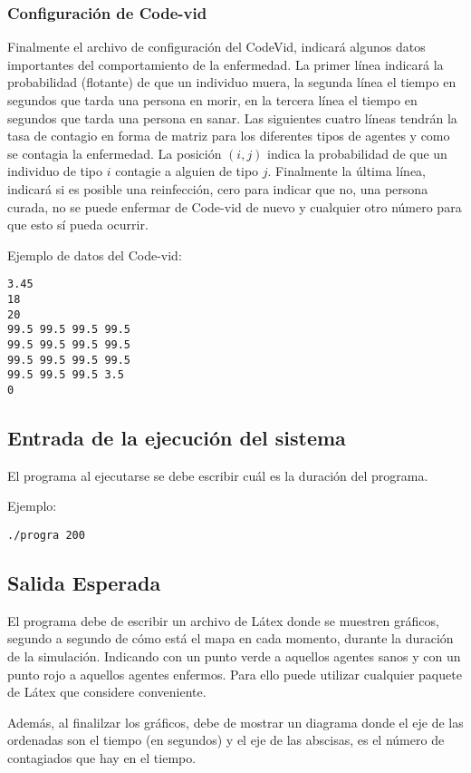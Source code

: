 \documentclass[11pt]{article}
\begin{document}
\subsubsection{Configuración de Code-vid}
Finalmente el archivo de configuración del CodeVid, indicará algunos datos importantes del comportamiento de la enfermedad.
La primer línea indicará la probabilidad (flotante) de que un individuo muera, la segunda línea el tiempo en segundos que tarda una persona en morir, en la tercera línea el tiempo en segundos que tarda una persona en sanar. Las siguientes cuatro líneas tendrán la tasa de contagio en forma de matriz para los diferentes tipos de agentes y como se contagia la enfermedad. La posición $(i,j)$ indica la probabilidad de que un individuo de tipo $i$ contagie a alguien de tipo $j$. Finalmente la última línea, indicará si es posible una reinfección, cero para indicar que no, una persona curada, no se puede enfermar de Code-vid de nuevo y cualquier otro número para que esto sí pueda ocurrir.

Ejemplo de datos del Code-vid:
\begin{verbatim}
3.45
18
20
99.5 99.5 99.5 99.5 
99.5 99.5 99.5 99.5 
99.5 99.5 99.5 99.5 
99.5 99.5 99.5 3.5 
0
\end{verbatim}

\subsection{Entrada de la ejecución del sistema}
El programa al ejecutarse se debe escribir cuál es la duración del programa. 

Ejemplo:
\begin{verbatim}
./progra 200
\end{verbatim}

\subsection{Salida Esperada}


El programa debe de escribir un archivo de Látex donde se muestren gráficos, segundo a segundo de cómo está el mapa en cada momento, durante la duración de la simulación. Indicando con un punto verde a aquellos agentes sanos y con un punto rojo a aquellos agentes enfermos. Para ello puede utilizar cualquier paquete de Látex que considere conveniente.

Además, al finalilzar los gráficos, debe de mostrar un diagrama donde el eje de las ordenadas son el tiempo (en segundos) y el eje de las abscisas, es el número de contagiados que hay en el tiempo.
\end{document}
